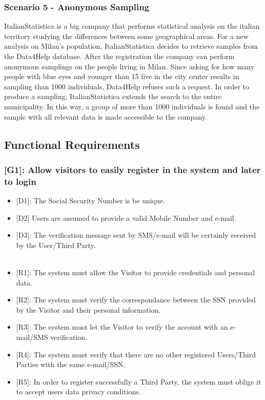 \documentclass[12pt,a4paper]{article}
\begin{document}
	\subsubsection*{Scenario 5 - Anonymous Sampling}
		ItalianStatistica is a big company that performs statistical analysis on the italian territory studying the differences between some geographical areas. For a new analysis on Milan's population, ItalianStatistica decides to retrieve samples from the Data4Help database. After the registration the company can perform anonymous samplings on the people living in Milan. Since asking for how many people with blue eyes and younger than 15 live in the city center results in sampling than 1000 individuals, Data4Help refuses such a request. In order to produce a sampling, ItalianStatistica extends the search to the entire municipality. In this way, a group of more than 1000 individuals is found and the sample with all relevant data is made accessible to the company.

	\newpage

	\subsection{Functional Requirements}

	\subsubsection*{{[}{G1}{]}: Allow visitors to easily register in the system and later to login}
	\begin{itemize}
		\begin{itemize}
			\item {[D1]}: The Social Security Number is be unique.
			\item {[D2]} Users are assumed to provide a valid Mobile Number and e-mail.
			\item {[D3]}: The verification message sent by SMS/e-mail will be certainly received by the User/Third Party.
			\\\\
			\item {[R1]}: The system must allow the Visitor to provide credentials and personal data.
			\item {[R2]}: The system must verify the correspondance between the SSN provided by the Visitor and their personal information.
			\item {[R3]}: The system must let the Visitor to verify the account with an e-mail/SMS verification.
			\item {[R4]}: The system must verify that there are no other registered Users/Third Parties with the same e-mail/SSN.
			\item {[R5]}: In order to register successfully a Third Party, the system must oblige it to accept users data privacy conditions.
		\end{itemize}
	\end{itemize}
\end{document}

